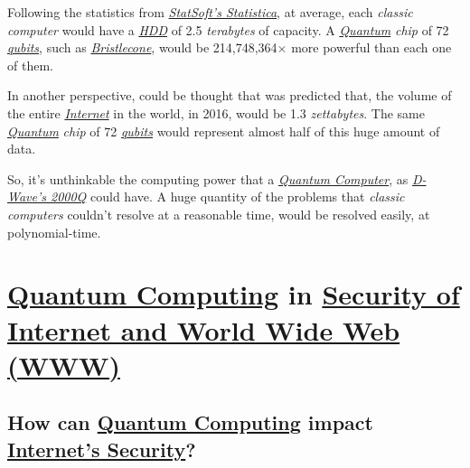 \documentclass[conference]{IEEEtran}
\begin{document}
\newpage

Following the statistics from \href{http://www.statsoft.com/Products/STATISTICA-Features}{\textit{StatSoft's Statistica}}, at average, each \textit{classic computer} would have a \href{https://en.wikipedia.org/wiki/Hard_disk_drive}{\textit{HDD}} of 2.5 \textit{terabytes} of capacity. A \href{https://en.wikipedia.org/wiki/Quantum}{\textit{Quantum}} \textit{chip} of 72 \href{https://en.wikipedia.org/wiki/Qubit}{\textit{qubits}}, such as \href{https://ai.googleblog.com/2018/03/a-preview-of-bristlecone-googles-new.html}{\textit{Bristlecone}}, would be 214,748,364$\times$ more powerful than each one of them.

\vspace{4pt}

In another perspective, could be thought that was predicted that, the volume of the entire \href{https://en.wikipedia.org/wiki/Internet}{\textit{Internet}} in the world, in 2016, would be 1.3 \textit{zettabytes}. The same \href{https://en.wikipedia.org/wiki/Quantum}{\textit{Quantum}} \textit{chip} of 72 \href{https://en.wikipedia.org/wiki/Qubit}{\textit{qubits}} would represent almost half of this huge amount of data.

\vspace{4pt}

So, it's unthinkable the computing power that a \href{https://en.wikipedia.org/wiki/Quantum_computing}{\textit{Quantum Computer}}, as \href{https://en.wikipedia.org/wiki/D-Wave_Systems#D-Wave_2X_and_D-Wave_2000Q}{\textit{D-Wave's 2000Q}} could have. A huge quantity of the problems that \textit{classic computers} couldn't resolve at a reasonable time, would be resolved easily, at polynomial-time.

\vspace{6pt}

\section{\href{https://en.wikipedia.org/wiki/Quantum_computing}{Quantum Computing} in \href{https://en.wikipedia.org/wiki/Internet_security}{Security of Internet and World Wide Web (WWW)}}

\vspace{4pt}

\subsection{How can \href{https://en.wikipedia.org/wiki/Quantum_computing}{Quantum Computing} impact \href{https://en.wikipedia.org/wiki/Internet_security}{Internet's Security}?}\label{AA}
\end{document}
